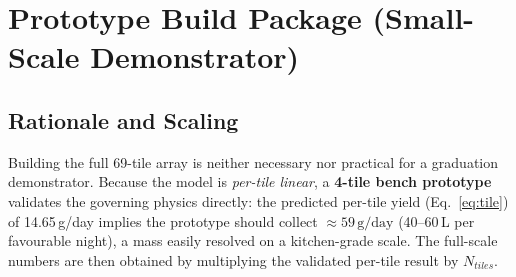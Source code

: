 \documentclass[12pt,a4paper]{report}
\newcommand{\num}[1]{#1}
\newcommand{\SI}[2]{#1\,\mbox{#2}}
\newcommand{\SIrange}[3]{#1--#2\,\mbox{#3}}
\newcommand{\per}{/}
\newcommand{\gram}{g}\newcommand{\kg}{kg}\newcommand{\kilogram}{kg}
\newcommand{\liter}{L}\newcommand{\litre}{L}
\newcommand{\dy}{day}\newcommand{\yr}{yr}
\begin{document}
\chapter{Prototype Build Package (Small-Scale Demonstrator)}
\label{ch:prototype}

\section{Rationale and Scaling}
Building the full \num{69}-tile array is neither necessary nor practical for a
graduation demonstrator. Because the model is \emph{per-tile linear}, a
\textbf{4-tile bench prototype} validates the governing physics directly: the
predicted per-tile yield (Eq.~\eqref{eq:tile}) of \SI{14.65}{\gram\per\dy}
implies the prototype should collect $\approx\SI{59}{\gram\per\dy}$
(\SIrange{40}{60}{\milli\liter} per favourable night), a mass easily resolved on
a kitchen-grade scale. The full-scale numbers are then obtained by multiplying
the validated per-tile result by $N_{tiles}$.
\end{document}
